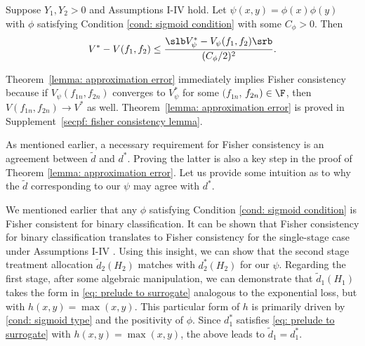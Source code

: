 \documentclass[preprint] {imsart}
\begin{document}
 
 
 
 
 
 \begin{theorem}\label{lemma: approximation error}
 Suppose $Y_1,Y_2>0$ and Assumptions I-IV hold. Let $\psi(x,y)=\phi(x)\phi(y)$ with $\phi$ satisfying Condition \ref{cond: sigmoid  condition} with some $C_\phi>0$. Then 
 \begin{equation}\label{scaling: ub: regret}
     V^*-  V(f_1,f_2)\leq \frac{ \slb V_\psi^*-  V_\psi(f_1,f_2)\srb}{(C_\phi/2)^2}.
 \end{equation}
 \end{theorem}
 Theorem~\ref{lemma: approximation error} immediately implies Fisher consistency because if $V_{\psi}(f_{1n},f_{2n})$ converges to $ V_\psi^*$ for some $(f_{1n}$, $f_{2n})\in\F$, then $V(f_{1n},f_{2n})\to V^*$ as well. Theorem~\ref{lemma: approximation error} is proved in Supplement~\ref{secpf: fisher consistency lemma}. 
 
{\color{black} As\label{intuition}  mentioned earlier, a necessary requirement for Fisher consistency is an agreement between $\tilde d$ and $d^*$. 
Proving the latter is also a key step in the proof of Theorem \ref{lemma: approximation error}. Let us provide some intuition as to why the $\tilde d$ corresponding to our $\psi$ may agree with $d^*$.

We mentioned earlier that any $\phi$ satisfying Condition \ref{cond: sigmoid  condition} is Fisher consistent for binary classification. It can be  shown that Fisher consistency for binary classification translates to Fisher consistency for the single-stage case under Assumptions I-IV \citep{chen2017}. Using this insight, we can show that the second stage treatment allocation $\tilde d_2(H_2)$ matches with $d_2^*(H_2)$ for our $\psi$. 
Regarding the first stage, after some algebraic manipulation, we can demonstrate that $\tilde d_1(H_1)$ takes the form in \eqref{eq: prelude to surrogate} analogous to the exponential loss, but with $h(x,y) = \max(x, y)$.  This particular form of $h$ is primarily driven by \eqref{cond: sigmoid type} and the positivity of $\phi$. Since $d_1^*$ satisfies \eqref{eq: prelude to surrogate} with $h(x,y) = \max(x, y)$, the above leads to  $\tilde d_1=d_1^*$.} 
\end{document}
